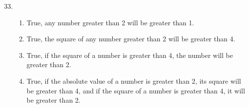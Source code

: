 \documentclass[12pt]{article}
\begin{document}
\begin{enumerate}
\setcounter{enumi}{32} %
\item
  \begin{enumerate}
  \item True, any number greater than 2 will be greater than 1.
  \item True, the square of any number greater than 2 will be greater than 4.
  \item True, if the square of a number is greater than 4, the number will be greater than 2.
  \item True, if the absolute value of a number is greater than 2, its square will be greater than 4, and if
    the square of a number is greater than 4, it will be greater than 2.
  \end{enumerate}

\end{enumerate}
\end{document}
